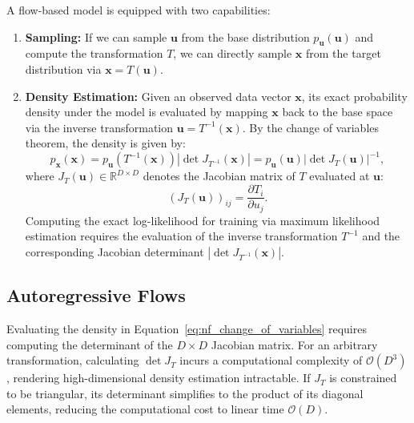 \documentclass[12pt]{article}
\renewcommand{\vec}[1]{\boldsymbol{\mathbf{#1}}}
\begin{document}
        A flow-based model is equipped with two capabilities:
        \begin{enumerate}
            \item \textbf{Sampling:} If we can sample $\vec{u}$ from the base distribution $p_{\vec{u}}(\vec{u})$ and compute the transformation $T$, we can directly sample $\vec{x}$ from the target distribution via $\vec{x} = T(\vec{u})$.

            \item \textbf{Density Estimation:} Given an observed data vector $\vec{x}$, its exact probability density under the model is evaluated by mapping $\vec{x}$ back to the base space via the inverse transformation $\vec{u} = T^{-1}(\vec{x})$. By the change of variables theorem, the density is given by:
            \begin{equation}
                p_{\vec{x}}(\vec{x}) = p_{\vec{u}}\!\left(T^{-1}(\vec{x})\right) \left| \det J_{T^{-1}}(\vec{x}) \right| = p_{\vec{u}}(\vec{u}) \left| \det J_T(\vec{u}) \right|^{-1},
                \label{eq:nf_change_of_variables}
            \end{equation}
            where $J_T(\vec{u}) \in \mathbb{R}^{D \times D}$ denotes the Jacobian matrix of $T$ evaluated at $\vec{u}$:
            \begin{equation}
                \left( J_T(\vec{u}) \right)_{ij} = \frac{\partial T_i}{\partial u_j}.
            \end{equation}
            Computing the exact log-likelihood for training via maximum likelihood estimation requires the evaluation of the inverse transformation $T^{-1}$ and the corresponding Jacobian determinant $ \left| \det J_{T^{-1}}(\vec{x}) \right|$.
        \end{enumerate}


    \subsection{Autoregressive Flows}%
    \label{sub:autoregressive_flows}

        Evaluating the density in Equation~\eqref{eq:nf_change_of_variables} requires computing the determinant of the $D \times D$ Jacobian matrix. For an arbitrary transformation, calculating $\det J_T$ incurs a computational complexity of $\mathcal{O}(D^3)$, rendering high-dimensional density estimation intractable. If $J_T$ is constrained to be triangular, its determinant simplifies to the product of its diagonal elements, reducing the computational cost to linear time $\mathcal{O}(D)$.
\end{document}
